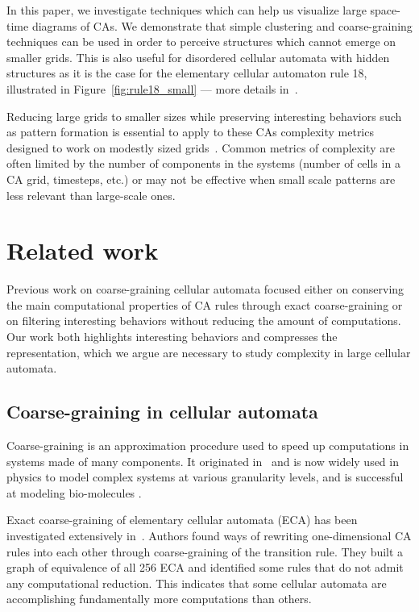 In this paper, we investigate techniques which can help us visualize large
space-time diagrams of CAs. We demonstrate that simple clustering and
coarse-graining techniques can be used in order to perceive structures which
cannot emerge on smaller grids. This is also useful for disordered cellular
automata with hidden structures as it is the case for the elementary cellular
automaton rule 18, illustrated in Figure~\ref{fig:rule18_small} --- more details
in~.

Reducing large grids to smaller sizes while preserving interesting behaviors
such as pattern formation is essential to apply to these CAs complexity metrics
designed to work on modestly sized
grids~\parencite{grassbergerQuantitativeTheorySelfgenerated1986,
  zenilCompressionBasedInvestigationDynamical2010,
  soler-toscanoCalculatingKolmogorovComplexity2014,
  zenilTwodimensionalKolmogorovComplexity2015}. Common metrics of complexity are
often limited by the number of components in the systems (number of cells in a
CA grid, timesteps, etc.) or may not be effective when small scale patterns are
less relevant than large-scale ones.

\section{Related work}

Previous work on coarse-graining cellular automata focused either on conserving
the main computational properties of CA rules through exact coarse-graining or
on filtering interesting behaviors without reducing the amount of computations.
Our work both highlights interesting behaviors and compresses the
representation, which we argue are necessary to study complexity in large
cellular automata.

\subsection{Coarse-graining in cellular automata}
Coarse-graining is an approximation procedure used to speed up computations in
systems made of many components. It originated
in~\parencite{levittComputerSimulationProtein1975} and is now widely used in physics
to model complex systems at various granularity levels, and is successful at
modeling bio-molecules \parencite{potoyanRecentSuccessesCoarsegrained2013,
  ingolfssonPowerCoarseGraining2014, kmiecikCoarseGrainedProteinModels2016}.

Exact coarse-graining of elementary cellular automata (ECA) has been
investigated extensively
in~\parencite{israeliComputationalIrreducibilityPredictability2004,
  israeliCoarsegrainingCellularAutomata2006}. Authors found ways of rewriting
one-dimensional CA rules into each other through coarse-graining of the
transition rule. They built a graph of equivalence of all 256 ECA and identified
some rules that do not admit any computational reduction. This indicates that
some cellular automata are accomplishing fundamentally more computations than
others.


